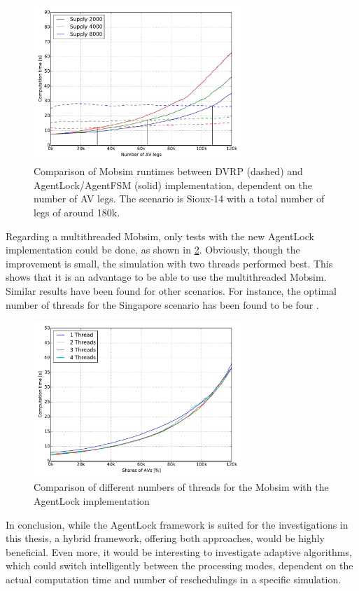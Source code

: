 \begin{figure}
    \centering
    \includegraphics[width=0.7\textwidth]{figures/dvrp_fsm.pdf}
    \caption{Comparison of Mobsim runtimes between DVRP (dashed) and AgentLock/AgentFSM (solid) implementation, dependent on the number of AV legs. The scenario is Sioux-14 with
    a total number of legs of around 180k.}
    \label{fig:dvrpfsm}
\end{figure}

Regarding a multithreaded Mobsim, only tests with the new AgentLock implementation
could be done, as shown in \cref{fig:threads}. Obviously, though the improvement
is small, the simulation with two threads performed best. This shows that it is
an advantage to be able to use the multithreaded Mobsim. Similar results
have been found for other scenarios. For instance, the optimal number of threads
for the Singapore scenario has been found to be four \citep{Erath2014}.

\begin{figure}
    \centering
    \includegraphics[width=0.7\textwidth]{figures/threads.pdf}
    \caption{Comparison of different numbers of threads for the Mobsim with the AgentLock implementation}
    \label{fig:threads}
\end{figure}

In conclusion, while the AgentLock framework is suited for the investigations in
this thesis, a hybrid framework, offering both approaches, would be highly beneficial.
Even more, it would be interesting
to investigate adaptive algorithms, which could switch intelligently between the
processing modes, dependent on the actual computation time and number of reschedulings
in a specific simulation.
